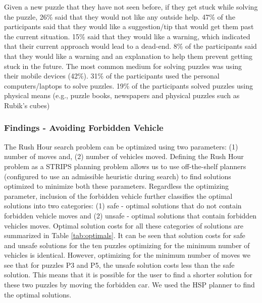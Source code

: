 \documentclass[doctor]{thesis} %
\theoremstyle{plain}
\begin{document}
Given a new puzzle that they have not seen before, if they get stuck while solving the puzzle, 26\% said that they would not like any outside help. 47\% of the participants said that they would like a suggestion/tip that would get them past the current situation. 15\% said that they would like a warning, which indicated that their current approach would lead to a dead-end. 8\% of the participants said that they would like a warning and an explanation to help them prevent getting stuck in the future.  The most common medium for solving puzzles was using their mobile devices (42\%). 31\% of the participants used the personal computers/laptops to solve puzzles. 19\% of the participants solved puzzles using physical means (e.g., puzzle books, newspapers and physical puzzles such as Rubik's  cubes)

\subsubsection*{Findings - Avoiding Forbidden Vehicle}
The Rush Hour search problem can be optimized using two parameters: (1) number of moves and, (2) number of vehicles moved. Defining the Rush Hour problem as a STRIPS planning problem allows us to use off-the-shelf planners (configured to use an admissible heuristic during search) to find solutions optimized to minimize both these parameters. Regardless the optimizing parameter, inclusion of the forbidden vehicle further classifies the optimal solutions into two categories: (1) safe - optimal solutions that do not contain forbidden vehicle moves and (2) unsafe - optimal solutions that contain forbidden vehicles moves. Optimal solution costs for all these categories of solutions are summarized in Table \ref{tab:optimals}. It can be seen that solution costs for safe and unsafe solutions for the ten puzzles optimizing for the minimum number of vehicles is identical. However, optimizing for the minimum number of moves we see that for puzzles P3 and P5, the unsafe solution costs less than the safe solution. This means that it is possible for the user to find a shorter solution for these two puzzles by moving the forbidden car. We used the HSP planner \cite{bonet01planningas} to find the optimal solutions.
\end{document}
